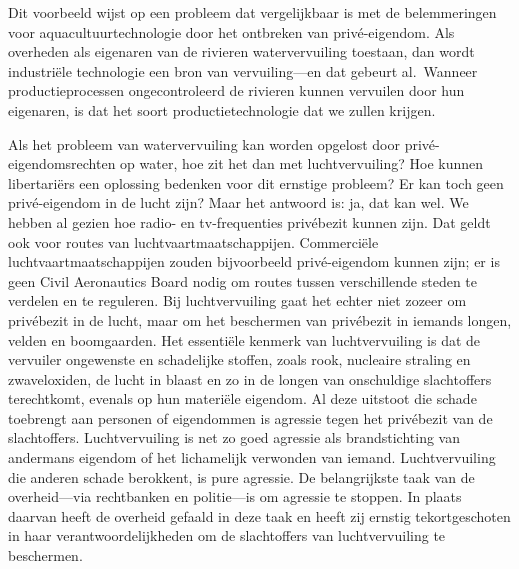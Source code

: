 \documentclass[
  a5paper,
  smalldemyvopaper,10pt,twoside,onecolumn,openright,extrafontsizes,hidelinks]{memoir}
\begin{document}
Dit voorbeeld wijst op een probleem dat vergelijkbaar is met de
belemmeringen voor aquacultuurtechnologie door het ontbreken van
privé-eigendom. Als overheden als eigenaren van de rivieren
watervervuiling toestaan, dan wordt industriële technologie een bron van
vervuiling---en dat gebeurt al.~Wanneer productieprocessen
ongecontroleerd de rivieren kunnen vervuilen door hun eigenaren, is dat
het soort productietechnologie dat we zullen krijgen.

Als het probleem van watervervuiling kan worden opgelost door
privé-eigendomsrechten op water, hoe zit het dan met luchtvervuiling?
Hoe kunnen libertariërs een oplossing bedenken voor dit ernstige
probleem? Er kan toch geen privé-eigendom in de lucht zijn? Maar het
antwoord is: ja, dat kan wel. We hebben al gezien hoe radio- en
tv-frequenties privébezit kunnen zijn. Dat geldt ook voor routes van
luchtvaartmaatschappijen. Commerciële luchtvaartmaatschappijen zouden
bijvoorbeeld privé-eigendom kunnen zijn; er is geen Civil Aeronautics
Board nodig om routes tussen verschillende steden te verdelen en te
reguleren. Bij luchtvervuiling gaat het echter niet zozeer om privébezit
in de lucht, maar om het beschermen van privébezit in iemands longen,
velden en boomgaarden. Het essentiële kenmerk van luchtvervuiling is dat
de vervuiler ongewenste en schadelijke stoffen, zoals rook, nucleaire
straling en zwaveloxiden, de lucht in blaast en zo in de longen van
onschuldige slachtoffers terechtkomt, evenals op hun materiële eigendom.
Al deze uitstoot die schade toebrengt aan personen of eigendommen is
agressie tegen het privébezit van de slachtoffers. Luchtvervuiling is
net zo goed agressie als brandstichting van andermans eigendom of het
lichamelijk verwonden van iemand. Luchtvervuiling die anderen schade
berokkent, is pure agressie. De belangrijkste taak van de overheid---via
rechtbanken en politie---is om agressie te stoppen. In plaats daarvan
heeft de overheid gefaald in deze taak en heeft zij ernstig
tekortgeschoten in haar verantwoordelijkheden om de slachtoffers van
luchtvervuiling te beschermen.
\end{document}
